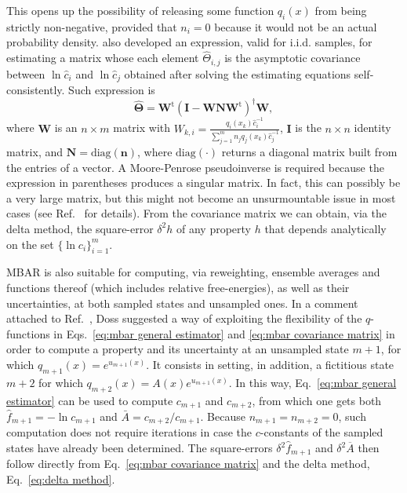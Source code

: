 \documentclass[journal=jctcce,manuscript=article,layout=twocolumn]{achemso}
\newcommand{\mt}[1]{\boldsymbol{\mathbf{#1}}}   %
\newcommand{\vt}[1]{\boldsymbol{\mathbf{#1}}}   %
\newcommand{\tr}[1]{#1^\text{t}}                %
\newcommand{\avg}[1]{\overline{#1}}             %
\begin{document}
This opens up the possibility of releasing some function $q_i(x)$ from being strictly non-negative, provided that $n_i = 0$ because it would not be an actual probability density. \citeauthor{Kong_2003} \cite{Kong_2003} also developed an expression, valid for i.i.d. samples, for estimating a matrix whose each element $\hat \Theta_{i,j}$ is the asymptotic covariance between $\ln \hat c_i$ and $\ln \hat c_j$ obtained after solving the estimating equations self-consistently. Such expression is
\begin{equation}
\label{eq:mbar covariance matrix}
\hat{\mt \Theta} = \tr{\mt W} (\mt I - {\mt W}{\mt N}\tr{\mt W})^\dag {\mt W},
\end{equation}
where $\mt W$ is an $n \times m$ matrix with $W_{k,i} = \frac{q_i(x_k) \hat c_i^{-1}}{\sum_{j=1}^m n_j q_j(x_k) \hat c_j^{-1}}$, $\mt I$ is the $n \times n$ identity matrix, and $\mt N = \text{diag}(\vt n)$, where $\text{diag}(\cdot)$ returns a diagonal matrix built from the entries of a vector. A Moore-Penrose pseudoinverse is required because the expression in parentheses produces a singular matrix. In fact, this can possibly be a very large matrix, but this might not become an unsurmountable issue in most cases (see Ref.~ for details). From the covariance matrix we can obtain, via the delta method, the square-error $\delta^2 h$ of any property $h$ that depends analytically on the set $\{\ln c_i\}_{i=1}^m$.

MBAR is also suitable for computing, via reweighting, ensemble averages and functions thereof (which includes relative free-energies), as well as their uncertainties, at both sampled states and unsampled ones. In a comment attached to Ref.~, Doss suggested a way of exploiting the flexibility of the $q$-functions in Eqs.~\eqref{eq:mbar general estimator} and \eqref{eq:mbar covariance matrix} in order to compute a property and its uncertainty at an unsampled state $m+1$, for which $q_{m+1}(x) = e^{u_{m+1}(x)}$. It consists in setting, in addition, a fictitious state $m+2$ for which $q_{m+2}(x) = A(x)e^{u_{m+1}(x)}$. In this way, Eq.~\eqref{eq:mbar general estimator} can be used to compute $c_{m+1}$ and $c_{m+2}$, from which one gets both $\hat f_{m+1} = -\ln c_{m+1}$ and $\bar A = {c_{m+2}}/{c_{m+1}}$. Because $n_{m+1} = n_{m+2} = 0$, such computation does not require iterations in case the $c$-constants of the sampled states have already been determined. The square-errors $\delta^2 \hat f_{m+1}$ and $\delta^2 \avg A$ then follow directly from Eq.~\eqref{eq:mbar covariance matrix} and the delta method, Eq.~\eqref{eq:delta method}.
\end{document}
